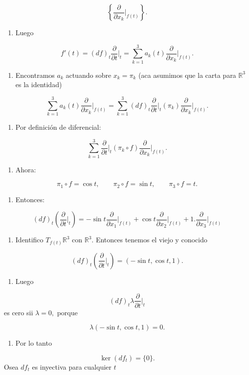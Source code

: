 \begin{bookproof}{}
\[
\left\{\frac{\partial}{\partial x_k}\bigg|_{f(t)}\right\}.
\]
\begin{enumerate}[start=2]
\item Luego
\end{enumerate}
\[
f'(t)=(df)_t\frac{\partial}{\partial t}\bigg|_t=\sum_{k=1}^3 a_k(t)\frac{\partial}{\partial x_k}\bigg|_{f(t)}.
\]
\begin{enumerate}[start=3]
\item Encontramos $a_k$ actuando sobre $x_k=\pi_k$ (aca asumimos que la carta para $\mathbb{R}^{3}$ es la identidad)
\end{enumerate}
\[
\sum_{k=1}^3 a_k(t)\frac{\partial}{\partial x_k}\bigg|_{f(t)}=\sum_{k=1}^3 (df)_t\frac{\partial}{\partial t}\bigg|_t(\pi_k)\frac{\partial}{\partial x_k}\bigg|_{f(t)}.
\]
\begin{enumerate}[start=4]
\item Por definición de diferencial:
\end{enumerate}
\[
\sum_{k=1}^3\frac{\partial}{\partial t}\bigg|_t(\pi_k\circ f)\frac{\partial}{\partial x_k}\bigg|_{f(t)}.
\]
\begin{enumerate}[start=5]
\item Ahora:
\end{enumerate}
\[
\pi_1\circ f=\cos t,\qquad \pi_2\circ f=\sin t,\qquad \pi_3\circ f=t.
\]
\begin{enumerate}[start=6]
\item Entonces:
\end{enumerate}
\[
(df)_t\left(\frac{\partial}{\partial t}\bigg|_t\right)=-\sin t\frac{\partial}{\partial x_1}\bigg|_{f(t)}+\cos t\frac{\partial}{\partial x_2}\bigg|_{f(t)}+1.\frac{\partial}{\partial x_3}\bigg|_{f(t)}
\]
\begin{enumerate}[start=7]
\item Identifico $T_{f(t)}\mathbb R^3$ con $\mathbb R^3.$ Entonces tenemos el viejo y conocido
\end{enumerate}
\[
(df)_t\left(\frac{\partial}{\partial t}\bigg|_t\right)=(-\sin t,\cos t,1).
\]
\begin{enumerate}[start=8]
\item Luego
\end{enumerate}
\[
(df)_t\lambda\frac{\partial}{\partial t}\bigg|_t
\]
es cero sii $\lambda=0,$ porque

\[
\lambda(-\sin t,\cos t,1)=0.
\]
\begin{enumerate}[start=9]
\item Por lo tanto
\end{enumerate}
\[
\ker(df_t)=\{0\}.
\]
Osea $df_{t}$ es inyectiva para cualquier $t$


\end{bookproof}
